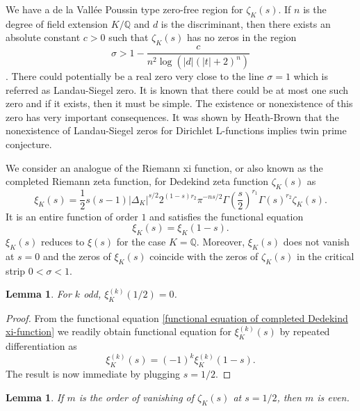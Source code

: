 \documentclass[12pt]{amsart}
\numberwithin{equation}{section}
\theoremstyle{myplain}
\theoremstyle{mydefinition}
\theoremstyle{plain}
\newtheorem{lemma}[theorem]{Lemma}
\theoremstyle{definition}
\def\Q{{\mathbb Q}}
\begin{document}
We have a de la Vall\'{e}e Poussin type zero-free region for $\zeta_K(s)$. If $n$ is the degree of field extension $K/\Q$ and $d$ is the discriminant, then there exists an absolute constant $c > 0$ such that $\zeta_K(s)$ has no zeros in the region 
\[
\sigma > 1 - \frac{c}{n^2 \log  (|d|(|t| + 2)^{n}) }
\]
\cite[Thm. 5.33]{iwaniec2021analytic}. There could potentially be a real zero very close to the line $\sigma  =1$ which is referred as Landau-Siegel zero. It is known that there could be at most one such zero and if it exists, then it must be simple. The existence or nonexistence of this zero has very important consequences. It was shown by Heath-Brown \cite{heath1983prime} that the nonexistence of Landau-Siegel zeros for Dirichlet L-functions implies twin prime conjecture.



We consider an analogue of the Riemann xi function, or also known as the completed Riemann zeta function, for Dedekind zeta function $\zeta_K(s)$ as
\begin{equation} \label{definition of Dedekind xi function}
\xi_K(s) = \frac{1}{2}s(s-1) |\Delta_K|^{s/2} 2^{(1-s)r_2} \pi^{-ns/2} \Gamma \left( \frac{s}{2} \right)^{r_1} \Gamma(s)^{r_2} \zeta_K(s).
\end{equation}
It is an entire function of order $1$ and satisfies the functional equation 
\begin{equation} \label{functional equation of completed Dedekind xi-function}
\xi_K(s) = \xi_K(1-s).
\end{equation}
$\xi_K(s)$ reduces to $\xi(s)$ for the case $K = \Q$. Moreover, $\xi_K(s)$ does not vanish at $s = 0$ and the zeros of $\xi_K(s)$ coincide with the zeros of $\zeta_K(s)$ in the critical strip $0 < \sigma < 1$.


\begin{lemma} \label{vanishing of xi_K at 1/2}
For $k$ odd, $\xi_K^{(k)}(1/2) = 0$.
\end{lemma}

\begin{proof}
From the functional equation \eqref{functional equation of completed Dedekind xi-function} we readily obtain functional equation for $\xi_K^{(k)}(s)$ by repeated differentiation as
\[
\xi_K^{(k)}(s) = (-1)^{k} \xi_K^{(k)}(1-s).
\]
The result is now immediate by plugging $s = 1/2$.
\end{proof}


\begin{lemma}
If $m$ is the order of vanishing of $\zeta_K(s)$ at $s = 1/2$, then $m$ is even.
\end{lemma}
\end{document}
